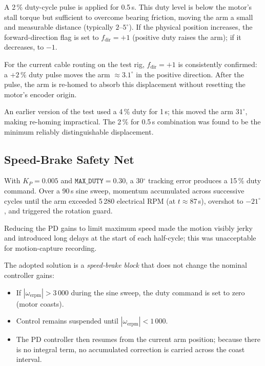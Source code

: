 \documentclass[12pt,a4paper]{article}
\begin{document}
A 2\,\% duty-cycle pulse is applied for 0.5\,s.  This duty level is
below the motor's stall torque but sufficient to overcome bearing
friction, moving the arm a small and measurable distance (typically
$2$--$5^\circ$).  If the physical position increases, the
forward-direction flag is set to $f_{\text{dir}} = +1$ (positive duty
raises the arm); if it decreases, to $-1$.

For the current cable routing on the test rig, $f_{\text{dir}} = +1$
is consistently confirmed: a $+2\,\%$ duty pulse moves the arm
$\approx 3.1^\circ$ in the positive direction.  After the pulse, the
arm is re-homed to absorb this displacement without resetting the
motor's encoder origin.

An earlier version of the test used a 4\,\% duty for 1\,s; this moved
the arm $31^\circ$, making re-homing impractical.  The 2\,\% for 0.5\,s
combination was found to be the minimum reliably distinguishable
displacement.

\subsection{Speed-Brake Safety Net}
\label{sec:speed_brake}

With $K_P = 0.005$ and $\texttt{MAX\_DUTY} = 0.30$, a 30$^\circ$
tracking error produces a 15\,\% duty command.  Over a 90\,s sine sweep,
momentum accumulated across successive cycles until the arm exceeded
5\,280 electrical RPM (at $t \approx 87$\,s), overshot to
$-21^\circ$, and triggered the rotation guard.

Reducing the PD gains to limit maximum speed made the motion visibly
jerky and introduced long delays at the start of each half-cycle;
this was unacceptable for motion-capture recording.

The adopted solution is a \emph{speed-brake block} that does not change
the nominal controller gains:

\begin{itemize}
  \item If $|\omega_{\text{erpm}}| > 3\,000$ during the sine sweep,
    the duty command is set to zero (motor coasts).
  \item Control remains suspended until
    $|\omega_{\text{erpm}}| < 1\,000$.
  \item The PD controller then resumes from the current arm position;
    because there is no integral term, no accumulated correction is
    carried across the coast interval.
\end{itemize}
\end{document}
